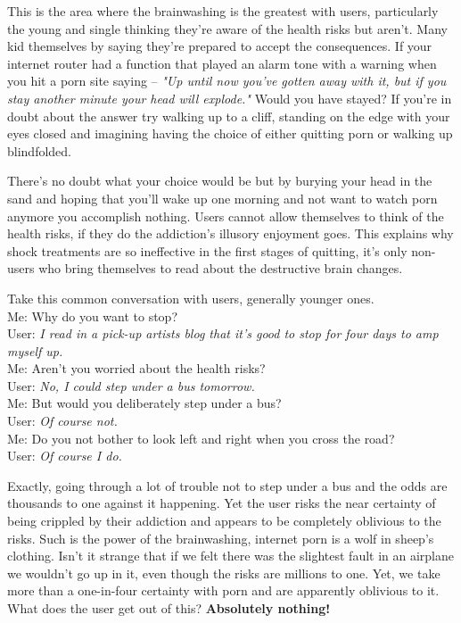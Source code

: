 \documentclass[easypeasy.tex]{subfiles}
\begin{document}
This is the area where the brainwashing is the greatest with users, particularly the young and single thinking they're aware of the health risks but aren't. Many kid themselves by saying they're prepared to accept the consequences. If your internet router had a function that played an alarm tone with a warning when you hit a porn site saying -- \textit{"Up until now you've gotten away with it, but if you stay another minute your head will explode."} Would you have stayed? If you're in doubt about the answer try walking up to a cliff, standing on the edge with your eyes closed and imagining having the choice of either quitting porn or walking up blindfolded.

There's no doubt what your choice would be but by burying your head in the sand and hoping that you'll wake up one morning and not want to watch porn anymore you accomplish nothing. Users cannot allow themselves to think of the health risks, if they do the addiction's illusory enjoyment goes. This explains why shock treatments are so ineffective in the first stages of quitting, it's only non-users who bring themselves to read about the destructive brain changes.

Take this common conversation with users, generally younger ones. \\
  Me: Why do you want to stop? \\
  User: \textit{I read in a pick-up artists blog that it's good to stop for four days to amp myself up.} \\
  Me: Aren't you worried about the health risks? \\
  User: \textit {No, I could step under a bus tomorrow.} \\
  Me: But would you deliberately step under a bus? \\
  User: \textit{Of course not.} \\
  Me: Do you not bother to look left and right when you cross the road? \\
  User: \textit{Of course I do.}

Exactly, going through a lot of trouble not to step under a bus and the odds are thousands to one against it happening. Yet the user risks the near certainty of being crippled by their addiction and appears to be completely oblivious to the risks. Such is the power of the brainwashing, internet porn is a wolf in sheep's clothing. Isn't it strange that if we felt there was the slightest fault in an airplane we wouldn't go up in it, even though the risks are millions to one. Yet, we take more than a one-in-four certainty with porn and are apparently oblivious to it. What does the user get out of this? \textbf{Absolutely nothing!}
\end{document}
